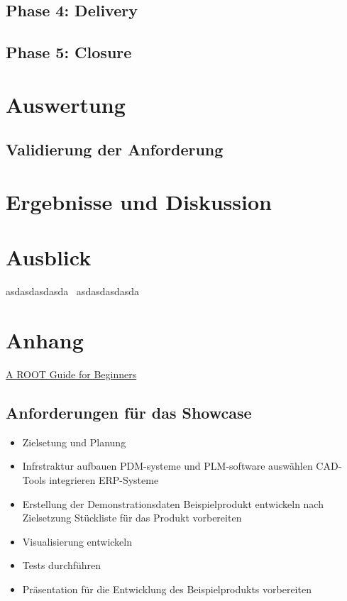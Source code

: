 \documentclass[a4paper, 12pt]{scrartcl}
\begin{document}
	\subsection{Phase 4: Delivery}
	\newpage
	\subsection{Phase 5: Closure}
	\newpage
	\section{Auswertung}
	\subsection{Validierung der Anforderung}%
	\newpage
	\section{Ergebnisse und Diskussion}
		\newpage
	\section{Ausblick}
	asdasdasdasda~\cite{karmasin2017gestaltung}
	asdasdasdasda~\cite{prevezanos2013technisches}
		\newpage
	\section{Anhang}
	
	
	\href{https://root.cern.ch/root/htmldoc/guides/primer/ROOTPrimer.html}{A ROOT Guide for Beginners}
	\subsection{Anforderungen für das Showcase}
	\begin{itemize}
		\item Zielsetung und Planung
		\item Infrstraktur aufbauen
		\subitem PDM-systeme und PLM-software auswählen
		\subitem CAD-Tools integrieren
		\subitem ERP-Systeme 
		\item Erstellung der Demonstrationsdaten
		\subitem Beispielprodukt entwickeln nach Zielsetzung
		\subitem Stückliste für das Produkt vorbereiten
		\item Visualisierung entwickeln
		\item Tests durchführen
		\item Präsentation für die Entwicklung des Beispielprodukts vorbereiten 
	\end{itemize}
\end{document}
